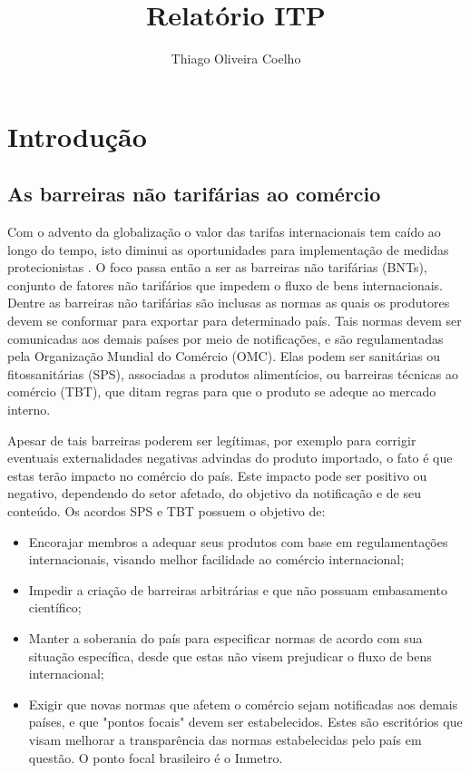 \documentclass[12pt, a4paper]{article}
\title{Relatório ITP}
\author{Thiago Oliveira Coelho}
\begin{document}
\maketitle

\tableofcontents

\clearpage

\section{Introdução}

\subsection{As barreiras não tarifárias ao comércio}
Com o advento da globalização o valor das tarifas internacionais tem caído ao longo do tempo, isto diminui as oportunidades para implementação de medidas protecionistas \cite{maskus2000quantifying}. O foco passa então a ser as barreiras não tarifárias (BNTs), conjunto de fatores não tarifários que impedem o fluxo de bens internacionais. Dentre as barreiras não tarifárias são inclusas as normas as quais os produtores devem se conformar para exportar para determinado país. Tais normas devem ser comunicadas aos demais países por meio de notificações, e são regulamentadas pela Organização Mundial do Comércio (OMC). Elas podem ser sanitárias ou fitossanitárias (SPS), associadas a produtos alimentícios, ou barreiras técnicas ao comércio (TBT), que ditam regras para que o produto se adeque ao mercado interno.

Apesar de tais barreiras poderem ser legítimas, por exemplo para corrigir eventuais externalidades negativas advindas do produto importado,  o fato é que estas terão impacto no comércio do país. Este impacto pode ser positivo ou negativo, dependendo do setor afetado, do objetivo da notificação e de seu conteúdo. Os acordos SPS e TBT possuem o objetivo de:

\begin{itemize}
    \item Encorajar membros a adequar seus produtos com base em regulamentações internacionais, visando melhor facilidade ao comércio internacional;
    \item Impedir a criação de barreiras arbitrárias e que não possuam embasamento científico;
    \item Manter a soberania do país para especificar normas de acordo com sua situação específica, desde que estas não visem prejudicar o fluxo de bens internacional;
    \item Exigir que novas normas que afetem o comércio sejam notificadas aos demais países, e que "pontos focais" devem ser estabelecidos. Estes são escritórios que visam melhorar a  transparência das normas estabelecidas pelo país em questão. O ponto focal brasileiro é o Inmetro.
\end{itemize}
\end{document}
